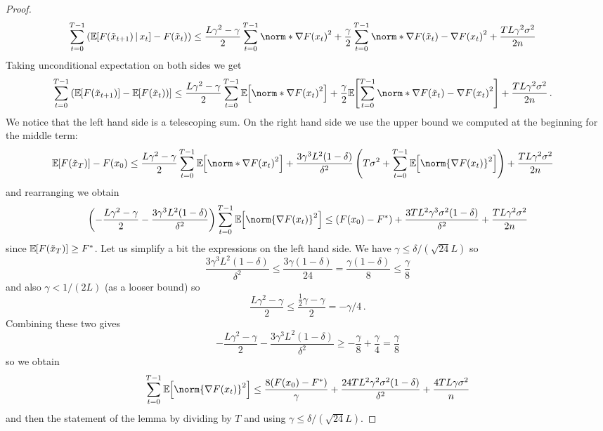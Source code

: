 \documentclass{article}
\begin{document}
\begin{proof}
  \begin{align*}
    \sum_{t=0}^{T-1} \left( \expec{ F(\tilde x_{t+1}) \,|\, x_t} - F(\tilde x_t) \right)
     & \leq
    \frac{L\gamma^2-\gamma}{2} \sum_{t=0}^{T-1} \norm*{\nabla F(x_t)}^2 + \frac{\gamma}{2} \sum_{t=0}^{T-1} \norm*{\nabla F(\tilde x_t) - \nabla F(x_t)}^2 + \frac{T L \gamma^2 \sigma^2}{2n}
  \end{align*}
  Taking unconditional expectation on both sides we get
  \begin{align*}
    \sum_{t=0}^{T-1} \left(\expec{F(\tilde x_{t+1})} - \expec{F(\tilde x_t)\right)}
     & \leq
    \frac{L\gamma^2-\gamma}{2} \sum_{t=0}^{T-1} \expec{\norm*{\nabla F(x_t)}^2}
    + \frac{\gamma}{2} \expec{ \sum_{t=0}^{T-1} \norm*{\nabla F(\tilde x_t) - \nabla F(x_t)}^2 }
    + \frac{T L \gamma^2 \sigma^2}{2n}
    \, .
  \end{align*}
  We notice that the left hand side is a telescoping sum. On the right hand side we use the upper bound we computed at the beginning for the middle term:
  \begin{align*}
    \expec{F(\tilde x_{T})} - F(x_0)
     & \leq
    \frac{L\gamma^2-\gamma}{2} \sum_{t=0}^{T-1} \expec{\norm*{\nabla F(x_t)}^2}
    + \frac{3 \gamma^3 L^2 (1-\delta)}{\delta^2} \left( T \sigma^2 + \sum_{t=0}^{T-1} \expec{ \norm{\nabla F(x_t)}^2 } \right)
    + \frac{T L \gamma^2 \sigma^2}{2n}
  \end{align*}
  and rearranging we obtain
  \[
    \left(-\frac{L\gamma^2-\gamma}{2} - \frac{3\gamma^3 L^2 (1-\delta)}{\delta^2}\right) \sum_{t=0}^{T-1} \expec{ \norm{\nabla F(x_t)}^2 }
    \leq
    (F(x_0) - F^\ast) + \frac{3 T L^2 \gamma^3 \sigma^2 (1-\delta)}{\delta^2} + \frac{TL \gamma^2 \sigma^2}{2n}
  \]
  since $\mathbb{\operatorname{\mathbb{E}}}_{\!\!}\left[F(\tilde x_T)\right] \geq F^\ast$. Let us simplify a bit the expressions on the left hand side. We have $\gamma \leq \delta / (\sqrt{24}L)$ so
  \[
    \frac{3\gamma^3 L^2 (1-\delta)}{\delta^2} \leq \frac{3\gamma (1-\delta)}{24} = \frac{\gamma (1-\delta)}{8} \leq \frac{\gamma}{8}
  \]
  and also $\gamma < 1/(2L)$ (as a looser bound) so
  \[
    \frac{L\gamma^2 - \gamma}{2} \leq \frac{\frac{1}{2} \gamma-\gamma}{2} = -\gamma / 4 \, .
  \]
  Combining these two gives
  \[
    -\frac{L\gamma^2-\gamma}{2} - \frac{3\gamma^3 L^2 (1-\delta)}{\delta^2} \geq -\frac{\gamma}{8} +\frac{\gamma}{4} = \frac{\gamma}{8}
  \]
  so we obtain
  \[
    \sum_{t=0}^{T-1} \expec{ \norm{\nabla F(x_t)}^2 }
    \leq
    \frac{8(F(x_0) - F^\ast)}{\gamma} + \frac{24 T L^2 \gamma^2 \sigma^2 (1-\delta)}{\delta^2} + \frac{4 TL \gamma \sigma^2}{n}
  \]
  and then the statement of the lemma by dividing by $T$ and using $\gamma \leq \delta/ (\sqrt{24} L)$.
\end{proof}
\end{document}
